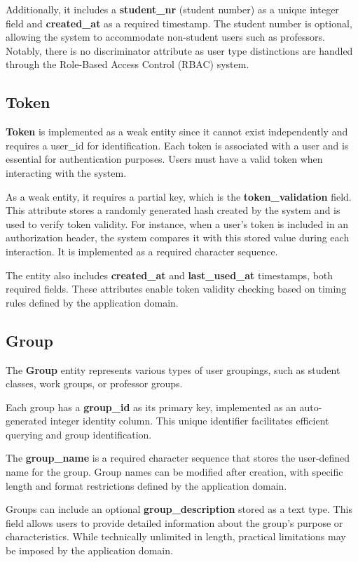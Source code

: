 Additionally, it includes a \textbf{student\_nr} (student number) as a unique integer field and \textbf{created\_at} as a required timestamp.
The student number is optional, allowing the system to accommodate non-student users such as professors. Notably, there is no discriminator attribute as user type distinctions are handled through the Role-Based Access Control (RBAC) system.

\subsection{Token}
\textbf{Token} is implemented as a weak entity since it cannot exist independently and requires a user\_id for identification. Each token is associated with a user and is essential for authentication purposes. Users must have a valid token when interacting with the system.

As a weak entity, it requires a partial key, which is the \textbf{token\_validation} field. This attribute stores a randomly generated hash created by the system and is used to verify token validity. 
For instance, when a user's token is included in an authorization header, the system compares it with this stored value during each interaction. It is implemented as a required character sequence.

The entity also includes \textbf{created\_at} and \textbf{last\_used\_at} timestamps, both required fields. These attributes enable token validity checking based on timing rules defined by the application domain.

\subsection{Group}
The \textbf{Group} entity represents various types of user groupings, such as student classes, work groups, or professor groups.

Each group has a \textbf{group\_id} as its primary key, implemented as an auto-generated integer identity column. This unique identifier facilitates efficient querying and group identification.

The \textbf{group\_name} is a required character sequence that stores the user-defined name for the group. Group names can be modified after creation, with specific length and format restrictions defined by the application domain.

Groups can include an optional \textbf{group\_description} stored as a text type. This field allows users to provide detailed information about the group's purpose or characteristics. While technically unlimited in length, practical limitations may be imposed by the application domain.

